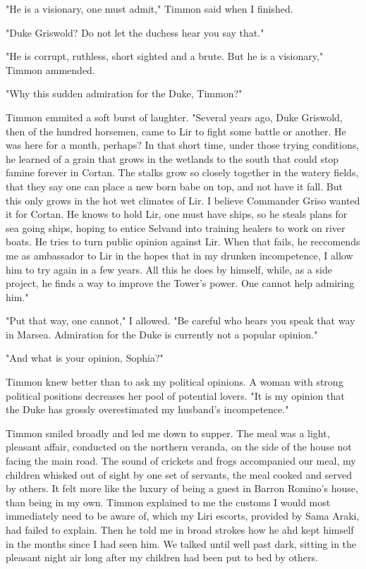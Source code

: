 \documentclass{article}
\begin{document}
"He is a visionary, one must admit," Timmon said when I finished. 

"Duke Griswold? Do not let the duchess hear you say that."

"He is corrupt, ruthless, short sighted and a brute. But he is a visionary," Timmon ammended.

"Why this sudden admiration for the Duke, Timmon?"

Timmon emmited a soft burst of laughter. "Several years ago, Duke Griswold, then of the hundred horsemen, came to Lir to fight some battle or another. He was here for a month, perhaps? In that short time, under those trying conditions, he learned of a grain that grows in the wetlands to the south that could stop famine forever in Cortan. The stalks grow so closely together in the watery fields, that they say one can place a new born babe on top, and not have it fall. But this only grows in the hot wet climates of Lir. I believe Commander Griso wanted it for Cortan. He knows to hold Lir, one must have ships, so he steals plans for sea going ships, hoping to entice Selvand into training healers to work on river boats. He tries to turn public opinion against Lir. When that fails, he reccomends me as ambassador to Lir in the hopes that in my drunken incompetence, I allow him to try again in a few years. All this he does by himself, while, as a side project, he finds a way to improve the Tower's power. One cannot help admiring him."

"Put that way, one cannot," I allowed. "Be careful who hears you speak that way in Marsea. Admiration for the Duke is currently not a popular opinion."

"And what is your opinion, Sophia?"

Timmon knew better than to ask my political opinions. A woman with strong political positions decreases her pool of potential lovers. "It is my opinion that the Duke has grossly overestimated my husband's incompetence."

Timmon smiled broadly and led me down to supper. The meal was a light, pleasant affair, conducted on the northern veranda, on the side of the house not facing the main road. The sound of crickets and frogs accompanied our meal, my children whisked out of sight by one set of servants, the meal cooked and served by others. It felt more like the luxury of being a guest in Barron Romino's house, than being in my own. Timmon explained to me the customs I would most immediately need to be aware  of, which my Liri escorts, provided by Sama Araki, had failed to explain. Then he told me in broad strokes how he ahd kept himself in the months since I had seen him. We talked until well past dark, sitting in the pleasant night air long after my children had been put to bed by others. 
\end{document}
